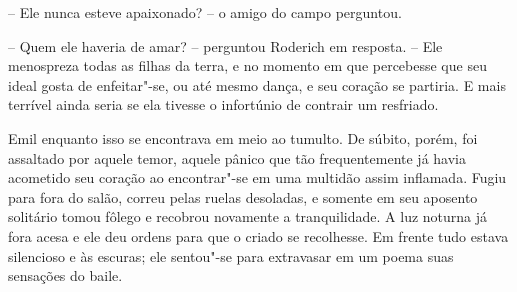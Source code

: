 -- Ele nunca esteve apaixonado? -- o amigo do campo perguntou.

-- Quem ele haveria de amar? -- perguntou Roderich em resposta. -- Ele
menospreza todas as filhas da terra, e no momento em que percebesse que
seu ideal gosta de enfeitar"-se, ou até mesmo dança, e seu coração se
partiria. E mais terrível ainda seria se ela tivesse o infortúnio de
contrair um resfriado.

Emil enquanto isso se encontrava em meio ao tumulto. De súbito, porém,
foi assaltado por aquele temor, aquele pânico que tão frequentemente já
havia acometido seu coração ao encontrar"-se em uma multidão assim
inflamada. Fugiu para fora do salão, correu pelas ruelas desoladas, e
somente em seu aposento solitário tomou fôlego e recobrou novamente a
tranquilidade. A luz noturna já fora acesa e ele deu ordens para que o
criado se recolhesse. Em frente tudo estava silencioso e às escuras;
ele sentou"-se para extravasar em um poema suas sensações do baile.


